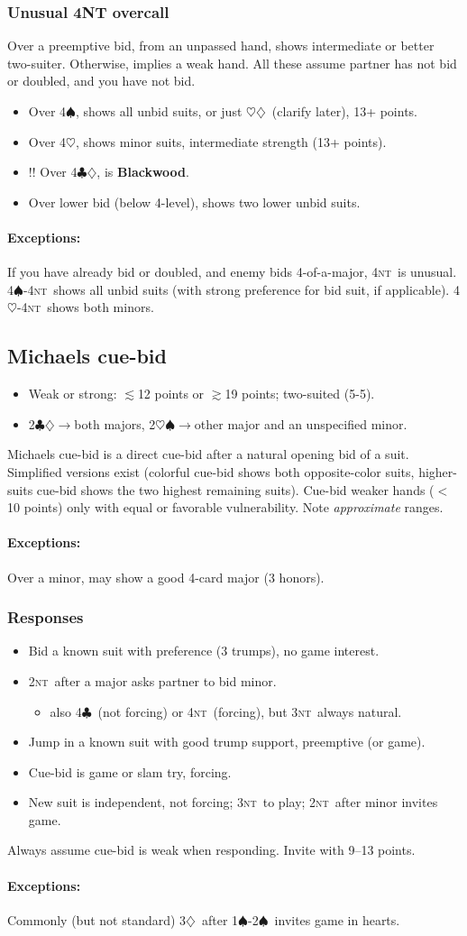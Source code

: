 \documentclass[10pt]{article}
\def\C{$\clubsuit$}
\def\D{$\diamondsuit$}
\def\H{$\heartsuit$}
\def\S{$\spadesuit$}
\def\NT{\textsc{nt}}
\let\TeXto\to
\def\to{$\TeXto$}
\def\lt{$<$}
\def\ltsim{$\lesssim$}
\def\gtsim{$\gtrsim$}
\def\except#1{\paragraph{\exceptparfont\bf Exceptions:}{\exceptfont #1}}
\renewcommand{\bullet}[1]{\begin{itemize}\item#1\end{itemize}\vspace*{-0.5pc}}
\newcommand{\crunch}[1][1]{\vspace*{-#1pc}}
\newenvironment{mylist}[1][.5]{\begin{itemize}\itemsep=-#1\baselineskip}{\end{itemize}}
\begin{document}
\subsubsection{Unusual 4NT overcall}
Over a preemptive bid, from an unpassed hand, shows intermediate or better
two-suiter.  Otherwise, implies a weak hand.  All these assume partner has not
bid or doubled, and you have not bid.
\begin{mylist}[.3]\small
\item Over 4\S, shows all unbid suits, or just \H\D\ (clarify later), 13+ points.
\item Over 4\H, shows minor suits, intermediate strength (13+ points).
\item[!!] {\normalsize Over 4\C\D, is \textbf{Blackwood}.}
\item Over lower bid (below 4-level), shows two lower unbid suits.
\end{mylist}
\except{If you have already bid or doubled, and enemy bids 4-of-a-major,
4\NT\ is unusual.  4\S-4\NT\ shows all unbid suits (with strong
preference for bid suit, if applicable).  4\H-4\NT\ shows both minors.}

\subsection{Michaels cue-bid}
\begin{mylist}[.3]
\item Weak or strong: \ltsim12 points or \gtsim19 points; two-suited (5-5).
\item 2\C\D\to both majors, 2\H\S\to other major and an unspecified minor.
\end{mylist}
Michaels cue-bid is a direct cue-bid after a natural opening bid of a suit.
Simplified versions exist (colorful cue-bid shows both opposite-color suits,
higher-suits cue-bid shows the two highest remaining suits).  Cue-bid weaker
hands (\lt 10 points) only with equal or favorable vulnerability.  Note
\emph{approximate} ranges.
\crunch
\except{Over a minor, may show a good 4-card major (3 honors).}

\subsubsection{Responses}
\begin{mylist}[.3]
\item Bid a known suit with preference (3 trumps), no game interest.
\item 2\NT\ after a major asks partner to bid minor.\crunch[.8]
\bullet{also 4\C\ (not forcing) or 4\NT\ (forcing), but 3\NT\ always natural.}
\item Jump in a known suit with good trump support, preemptive (or game).
\item Cue-bid is game or slam try, forcing.
\item {\small New suit is independent, not forcing; 3\NT\ to play; 
2\NT\ after minor invites game.}
\end{mylist}
Always assume cue-bid is weak when responding.  Invite with 9--13 points.\crunch
\except{Commonly (but not standard) 3\D\ after 1\S-2\S\ invites game in hearts.}
\end{document}
